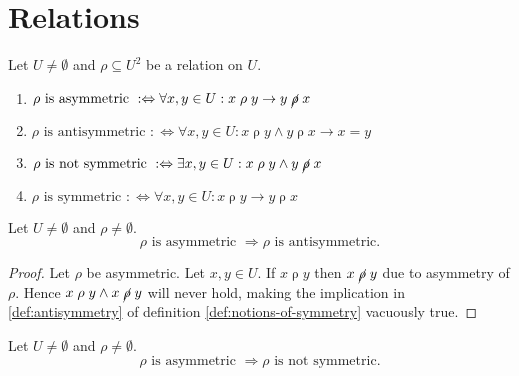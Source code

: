 \section{Relations}
\newcommand{\relsymbol}{\rho}
\newcommand{\reluniverse}{U}
\newcommand{\rel}[3][\relsymbol]{#2\mathrel{#1}#3}
\newcommand{\nrel}[3][\cancel{\relsymbol}]{#2\mathrel{#1}#3}

\begin{definition}

  Let $U \neq \emptyset$ and $\relsymbol \subseteq \reluniverse^2$ be a relation on $U$.
  \begin{enumerate}
    \item $\relsymbol \text{ is asymmetric } :\Leftrightarrow
            \forall x, y \in \reluniverse: \rel{x}{y} \rightarrow \nrel{y}{x}$
          \label{def:asymmetry}
    \item $\relsymbol \text{ is antisymmetric } :\Leftrightarrow
            \forall x, y \in \reluniverse: \rel{x}{y} \land \rel{y}{x} \rightarrow x = y$
          \label{def:antisymmetry}
    \item $\relsymbol \text{ is not symmetric } :\Leftrightarrow
            \exists x, y \in \reluniverse: \rel{x}{y} \land \nrel{y}{x}$
          \label{def:no-symmetry}
    \item $\relsymbol \text{ is symmetric } :\Leftrightarrow
            \forall x, y \in \reluniverse: \rel{x}{y} \rightarrow \rel{y}{x}$
          \label{def:symmetry}
  \end{enumerate}
  \label{def:notions-of-symmetry}
\end{definition}

\begin{claim}
  Let $\reluniverse \neq \emptyset$ and $\relsymbol \neq \emptyset$.
  \[
    \relsymbol \text{ is asymmetric } \Rightarrow \relsymbol \text{ is antisymmetric.}
  \]
\end{claim}

\begin{proof}
  Let $\relsymbol$ be asymmetric. Let $x, y \in \reluniverse$.
  If $\rel{x}{y}$ then $\nrel{x}{y}$ due to asymmetry of $\relsymbol$.
  Hence $\rel{x}{y} \land \nrel{x}{y}$ will never hold, making the implication in  \ref{def:antisymmetry} of definition \ref{def:notions-of-symmetry} vacuously true.

\end{proof}

\begin{claim}
  Let $\reluniverse \neq \emptyset$ and $\relsymbol \neq \emptyset$.
  \[
    \relsymbol \text{ is asymmetric } \Rightarrow \relsymbol \text{ is not symmetric.}
  \]
\end{claim}


